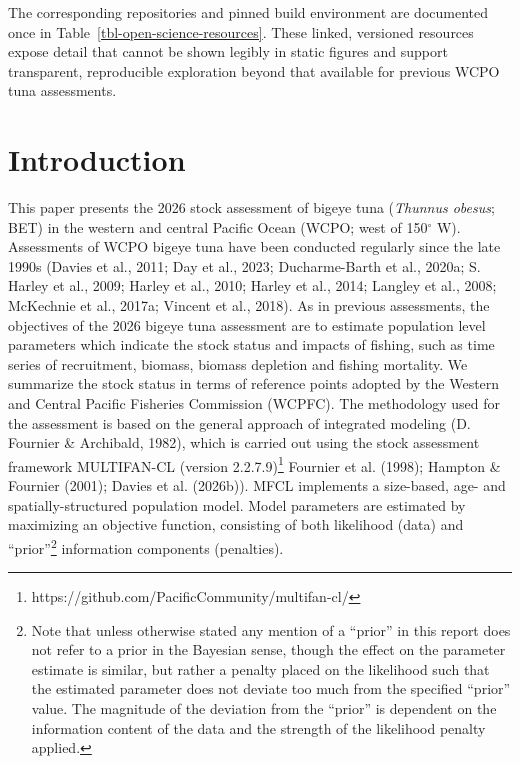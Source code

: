 \documentclass[
  english,
  a4paper,
  a4paper,
  11pt]{SCreport}
\begin{document}
The corresponding repositories and pinned build environment are
documented once in Table~\ref{tbl-open-science-resources}. These linked,
versioned resources expose detail that cannot be shown legibly in static
figures and support transparent, reproducible exploration beyond that
available for previous WCPO tuna assessments.

\section{Introduction}\label{sec-introduction}

This paper presents the 2026 stock assessment of bigeye tuna
(\emph{Thunnus obesus}; BET) in the western and central Pacific Ocean
(WCPO; west of 150\(^\circ\) W). Assessments of WCPO bigeye tuna have
been conducted regularly since the late 1990s (Davies et al., 2011; Day
et al., 2023; Ducharme-Barth et al., 2020a; S. Harley et al., 2009;
Harley et al., 2010; Harley et al., 2014; Langley et al., 2008;
McKechnie et al., 2017a; Vincent et al., 2018). As in previous
assessments, the objectives of the 2026 bigeye tuna assessment are to
estimate population level parameters which indicate the stock status and
impacts of fishing, such as time series of recruitment, biomass, biomass
depletion and fishing mortality. We summarize the stock status in terms
of reference points adopted by the Western and Central Pacific Fisheries
Commission (WCPFC). The methodology used for the assessment is based on
the general approach of integrated modeling (D. Fournier \& Archibald,
1982), which is carried out using the stock assessment framework
MULTIFAN-CL (version 2.2.7.9)\footnote{https://github.com/PacificCommunity/multifan-cl/}
Fournier et al. (1998); Hampton \& Fournier (2001); Davies et al.
(2026b)). MFCL implements a size-based, age- and spatially-structured
population model. Model parameters are estimated by maximizing an
objective function, consisting of both likelihood (data) and
``prior''\footnote{Note that unless otherwise stated any mention of a
  ``prior'' in this report does not refer to a prior in the Bayesian
  sense, though the effect on the parameter estimate is similar, but
  rather a penalty placed on the likelihood such that the estimated
  parameter does not deviate too much from the specified ``prior''
  value. The magnitude of the deviation from the ``prior'' is dependent
  on the information content of the data and the strength of the
  likelihood penalty applied.} information components (penalties).
\end{document}
